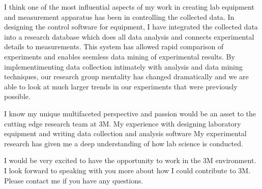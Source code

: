 \documentclass[11pt,a4paper,roman]{moderncv}        %
\newcommand{\company}{3M}
\newcommand{\shortcompany}{3M}
\begin{document}
I think one of the most influential aspects of my work in creating lab equipment and measurement apparatus has been in controlling the collected data.  
In designing the control software for equipment, I have integrated the collected data into a research database which does all data analysis and connects experimental details to measurements.
This system has allowed rapid comparison of experiments and enables seemless data mining of experimental results.  
By implementimenting data collection intimately with analysis and data mining techniques, our research group mentality has changed dramatically and we are able to look at much larger trends in our experiments that were previously possible.



I know my unique multifaceted perspective and passion would be an asset to the cutting edge research team at \company{}.
My experience with designing laboratory equipment and writing data collection and analysis software %
   My experimental research has given me a deep understanding of how lab science is conducted. %

I would be very excited to have the opportunity to work in the \shortcompany{}  environment.
I look forward to speaking with you more about how I could contribute to \company{}.
Please contact me if you have any questions.



\makeletterclosing
\end{document}
